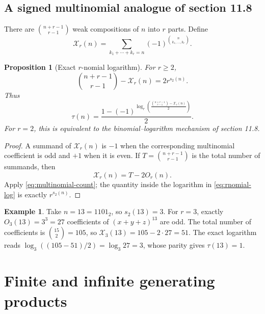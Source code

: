 \documentclass[11pt,oneside]{article}
\newtheorem{proposition}[theorem]{Proposition}
\theoremstyle{definition}
\newtheorem{example}[theorem]{Example}
\theoremstyle{remark}
\newcommand{\swt}{s_2}
\newcommand{\1}{\mathbf 1}
\begin{document}
\subsection{A signed multinomial analogue of section 11.8}

There are \(\binom{n+r-1}{r-1}\) weak compositions of \(n\) into \(r\) parts.  Define
\begin{equation}
 \mathcal X_r(n)=
 \sum_{k_1+\cdots+k_r=n}
 (-1)^{\binom{n}{k_1,\ldots,k_r}}.
 \label{eq:Xr}
\end{equation}

\begin{proposition}[Exact \(r\)-nomial logarithm]
\label{prop:rnomial-exact}
For \(r\ge2\),
\begin{equation}
 \binom{n+r-1}{r-1}-\mathcal X_r(n)
 =2r^{\swt(n)}.
 \label{eq:rnomial-exact}
\end{equation}
Thus
\begin{equation}
 \boxed{
 \tau(n)=
 \frac{1-(-1)^{\displaystyle
  \log_r\!\left(\frac{\binom{n+r-1}{r-1}-\mathcal X_r(n)}2\right)}}2.}
 \label{eq:rnomial-log}
\end{equation}
For \(r=2\), this is equivalent to the binomial--logarithm mechanism of section 11.8.
\end{proposition}

\begin{proof}
A summand of \(\mathcal X_r(n)\) is \(-1\) when the corresponding multinomial coefficient is
odd and \(+1\) when it is even.  If \(T=\binom{n+r-1}{r-1}\) is the total number of summands,
then
\[
 \mathcal X_r(n)=T-2O_r(n).
\]
Apply \eqref{eq:multinomial-count}; the quantity inside the logarithm in
\eqref{eq:rnomial-log} is exactly \(r^{\swt(n)}\).
\end{proof}

\begin{example}
Take \(n=13=1101_2\), so \(\swt(13)=3\).  For \(r=3\), exactly
\(O_3(13)=3^3=27\) coefficients of \((x+y+z)^{13}\) are odd.  The total number of
coefficients is \(\binom{15}{2}=105\), so
\(\mathcal X_3(13)=105-2\cdot27=51\).  The exact logarithm reads
\(\log_3((105-51)/2)=\log_3 27=3\), whose parity gives \(\tau(13)=1\).
\end{example}

\section{Finite and infinite generating products}
\label{sec:products}
\end{document}
